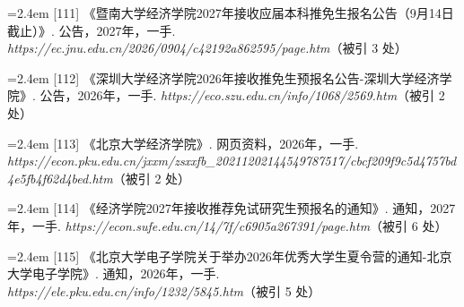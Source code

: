 {\noindent\hangindent=2.4em \label{src:S0135}{\color{cAccent}[111]} 《暨南大学经济学院2027年接收应届本科推免生报名公告（9月14日截止）》. 公告，2027年，一手. \textit{https://ec.jnu.edu.cn/2026/0904/c42192a862595/page.htm}（被引 3 处）\par
\vspace{0.6pt}
\vspace{3.5pt}\par
\nopagebreak\vspace{1pt}
\noindent\hangindent=2.4em \label{src:S0136}{\color{cAccent}[112]} 《深圳大学经济学院2026年接收推免生预报名公告-深圳大学经济学院》. 公告，2026年，一手. \textit{https://eco.szu.edu.cn/info/1068/2569.htm}（被引 2 处）\par
\vspace{0.6pt}
\vspace{3.5pt}\par
\nopagebreak\vspace{1pt}
\noindent\hangindent=2.4em \label{src:S0137}{\color{cAccent}[113]} 《北京大学经济学院》. 网页资料，2026年，一手. \textit{https://econ.pku.edu.cn/jxxm/zsxxfb\_20211202144549787517/cbcf209f9c5d4757bd4e5fb4f62d4bed.htm}（被引 2 处）\par
\vspace{0.6pt}
\vspace{3.5pt}\par
\nopagebreak\vspace{1pt}
\noindent\hangindent=2.4em \label{src:S0138}{\color{cAccent}[114]} 《经济学院2027年接收推荐免试研究生预报名的通知》. 通知，2027年，一手. \textit{https://econ.sufe.edu.cn/14/7f/c6905a267391/page.htm}（被引 6 处）\par
\vspace{0.6pt}
\vspace{3.5pt}\par
\nopagebreak\vspace{1pt}
\noindent\hangindent=2.4em \label{src:S0143}{\color{cAccent}[115]} 《北京大学电子学院关于举办2026年优秀大学生夏令营的通知-北京大学电子学院》. 通知，2026年，一手. \textit{https://ele.pku.edu.cn/info/1232/5845.htm}（被引 5 处）\par
\vspace{0.6pt}
\vspace{3.5pt}\par
}
